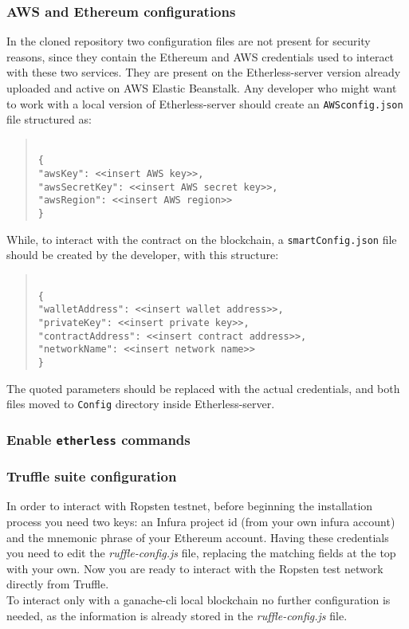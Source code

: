\subsubsection{AWS and Ethereum configurations}
In the cloned repository two configuration files are not present for security reasons, since they contain the Ethereum and AWS credentials used to interact with these two services. They are present on the Etherless-server version already uploaded and active on AWS Elastic Beanstalk.
Any developer who might want to work with a local version of Etherless-server should create an \texttt{AWSconfig.json} file structured as:
\begin{quote}
\texttt{ \\
	\{\\
		"awsKey": <<insert AWS key>>, \\
		"awsSecretKey": <<insert AWS secret key>>, \\
		"awsRegion": <<insert AWS region>> \\
	\}\\
}
\end{quote}
While, to interact with the contract on the blockchain, a \texttt{smartConfig.json} file should be created by the developer, with this structure:
\begin{quote}
\texttt{ \\
	\{\\
	"walletAddress": <<insert wallet address>>, \\
	"privateKey": <<insert private key>>, \\
	"contractAddress": <<insert contract address>>, \\
	"networkName": <<insert network name>> \\
	\}\\
}
\end{quote}
The quoted parameters should be replaced with the actual credentials, and both files moved to \texttt{Config} directory inside Etherless-server.
\subsubsection{Enable \texttt{etherless} commands}
\subsubsection{Truffle suite configuration}
	In order to interact with Ropsten testnet, before beginning the installation process you need two keys: an Infura project id (from your own infura account) and the mnemonic phrase of your Ethereum account. Having these credentials you need to edit the \textit{ruffle-config.js} file, replacing the matching fields at the top with your own. Now you are ready to interact with the Ropsten test network directly from Truffle.\\
	To interact only with a ganache-cli local blockchain no further configuration is needed, as the information is already stored in the \textit{ruffle-config.js} file.
